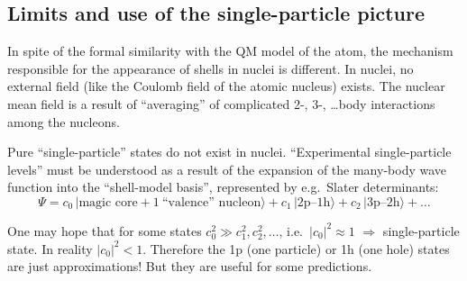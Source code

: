 \documentclass[11pt,a4paper]{article}
\newcommand{\spwell}{%
  \fill[gray!12] (-1.8,0) rectangle (1.8,0.45);
  \fill[blue!7] plot[domain=-1.8:1.8,samples=81] (\x,{Uw(\x)}) -- (1.8,0) -- (-1.8,0) -- cycle;
  \draw[gray] (-1.8,0) -- (1.8,0);
  \draw[very thick,blue!60!black] plot[domain=-1.8:1.8,samples=81] (\x,{Uw(\x)});}
\newcommand{\splev}[3][occlev]{%
  \pgfmathsetmacro\xt{xw(#2)}\draw[#1] (-\xt,#2) -- (\xt,#2);
  \foreach \s [count=\n] in {#3} {\xdef\spN{\n}}%
  \foreach \s [count=\k] in {#3} \node[\s] at ({0.32*(\k-(\spN+1)/2)},#2) {};}
\newcommand{\spempty}[1]{\pgfmathsetmacro\xt{xw(#1)}\draw[emptylev] (-\xt,#1) -- (\xt,#1);}
\newcommand{\spcore}{\splev{-2.7}{core,core}\splev{-2.3}{core,core,core,core}}
\begin{document}
\subsection{Limits and use of the single-particle picture}
In spite of the formal similarity with the QM model of the atom, the mechanism responsible for the appearance of shells in nuclei is different. In nuclei, no external field (like the Coulomb field of the atomic nucleus) exists. The nuclear mean field is a result of ``averaging'' of complicated 2-, 3-, \dots body interactions among the nucleons.

Pure ``single-particle'' states do not exist in nuclei. ``Experimental single-particle levels'' must be understood as a result of the expansion of the many-body wave function into the ``shell-model basis'', represented by e.g.\ Slater determinants:
\[
\Psi=c_0\,\big|\text{magic core}+1\ \text{``valence'' nucleon}\big\rangle
+c_1\,\big|2\text{p--}1\text{h}\big\rangle
+c_2\,\big|3\text{p--}2\text{h}\big\rangle+\dots
\]
\begin{center}
\end{center}
One may hope that for some states $c_0^2\gg c_1^2,c_2^2,\dots$, i.e.\ $|c_0|^2\approx1$ $\Rightarrow$ single-particle state. In reality $|c_0|^2<1$. Therefore the 1p (one particle) or 1h (one hole) states are just approximations! But they are useful for some predictions.
\end{document}
